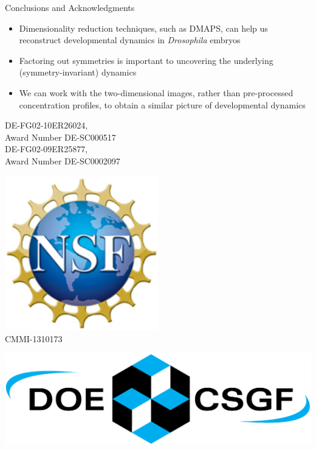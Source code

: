 \documentclass[10pt]{beamer}
\begin{document}
\begin{frame}{Conclusions and Acknowledgments}
    \begin{itemize}
        \item Dimensionality reduction techniques, such as DMAPS, can help  us reconstruct developmental dynamics in {\em Drosophila} embryos
        \item Factoring out symmetries is important to uncovering the underlying (symmetry-invariant) dynamics
        \item We can work with the two-dimensional images, rather than pre-processed concentration profiles, to obtain a similar picture of developmental dynamics
        
    \end{itemize}
    
     \vfill
    
    \centering
    \begin{minipage}{0.2\textwidth}
    	\centering
		{\footnotesize DE-FG02-10ER26024, \\Award Number DE-SC000517 \\ DE-FG02-09ER25877, \\Award Number DE-SC0002097 \par}
    \end{minipage}
    \begin{minipage}{0.2\textwidth}
    	\centering
    	\includegraphics[width=0.5\textwidth]{nsf1.jpg}\\
		{\footnotesize CMMI-1310173}
    \end{minipage}
    \begin{minipage}{0.2\textwidth}
	    \centering
    	\includegraphics[width=\textwidth]{CSGF_horiz_1200x360.png}
    \end{minipage}
    
\end{frame}
\end{document}
